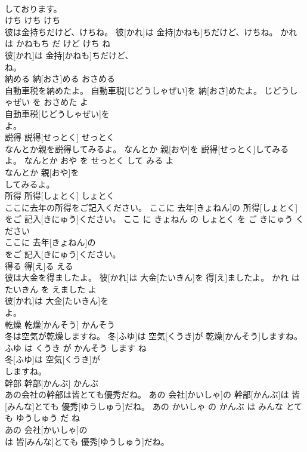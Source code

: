 \documentclass[8pt]{extreport}
\begin{document}
\begin{CJK}{UTF8}{min}
\\	しております。			
\\	けち	けち	けち	
\\	彼は金持ちだけど、けちね。	彼[かれ]は 金持[かねも]ちだけど、けちね。	かれ は かねもち だ けど けち ね	
\\	彼[かれ]は 金持[かねも]ちだけど、
\\	ね。			
\\	納める	納[おさ]める	おさめる	
\\	自動車税を納めたよ。	自動車税[じどうしゃぜい]を 納[おさ]めたよ。	じどうしゃぜい を おさめた よ	
\\	自動車税[じどうしゃぜい]を
\\	よ。			
\\	説得	説得[せっとく]	せっとく	
\\	なんとか親を説得してみるよ。	なんとか 親[おや]を 説得[せっとく]してみるよ。	なんとか おや を せっとく して みる よ	
\\	なんとか 親[おや]を
\\	してみるよ。			
\\	所得	所得[しょとく]	しょとく	
\\	ここに去年の所得をご記入ください。	ここに 去年[きょねん]の 所得[しょとく]をご 記入[きにゅう]ください。	ここ に きょねん の しょとく を ご きにゅう ください	
\\	ここに 去年[きょねん]の
\\	をご 記入[きにゅう]ください。			
\\	得る	得[え]る	える	
\\	彼は大金を得ましたよ。	彼[かれ]は 大金[たいきん]を 得[え]ましたよ。	かれ は たいきん を えました よ	
\\	彼[かれ]は 大金[たいきん]を
\\	よ。			
\\	乾燥	乾燥[かんそう]	かんそう	
\\	冬は空気が乾燥しますね。	冬[ふゆ]は 空気[くうき]が 乾燥[かんそう]しますね。	ふゆ は くうき が かんそう します ね	
\\	冬[ふゆ]は 空気[くうき]が
\\	しますね。			
\\	幹部	幹部[かんぶ]	かんぶ	
\\	あの会社の幹部は皆とても優秀だね。	あの 会社[かいしゃ]の 幹部[かんぶ]は 皆[みんな]とても 優秀[ゆうしゅう]だね。	あの かいしゃ の かんぶ は みんな とても ゆうしゅう だ ね	
\\	あの 会社[かいしゃ]の
\\	は 皆[みんな]とても 優秀[ゆうしゅう]だね。			

\end{CJK}
\end{document}
